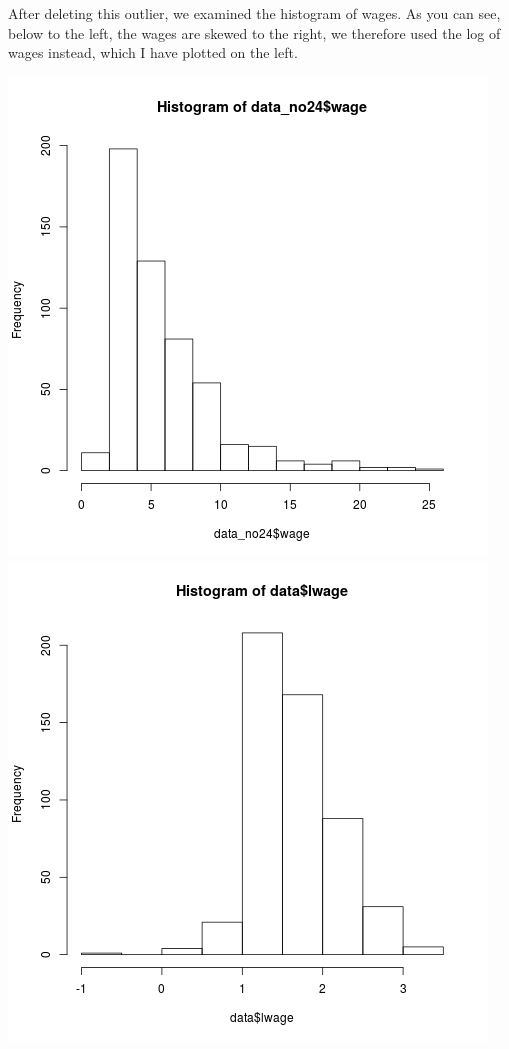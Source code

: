 \documentclass[12pt,a4paper,twoside]{article}
\begin{document}
After deleting this outlier, we examined the histogram of wages. As you can see, below to the left, the wages are skewed to the right, we therefore used the log of wages instead, which I have plotted on the left.
\begin{center}
\includegraphics[scale=.4]{plot2.png}
\includegraphics[scale=.4]{plot1.png}
\end{center}
\end{document}
